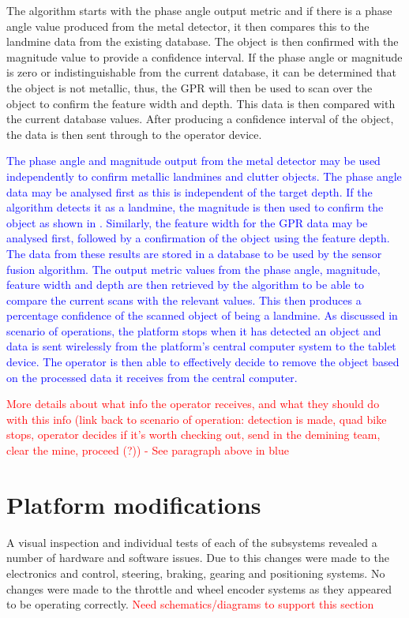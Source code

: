 \documentclass[main.tex]{subfiles}
\begin{document}
The algorithm starts with the phase angle output metric and if there is a phase angle value produced from the metal detector, it then compares this to the landmine data from the existing database. The object is then confirmed with the magnitude value to provide a confidence interval. If the phase angle or magnitude is zero or indistinguishable from the current database, it can be determined that the object is not metallic, thus, the GPR will then be used to scan over the object to confirm the feature width and depth. This data is then compared with the current database values. After producing a confidence interval of the object, the data is then sent through to the operator device.  


\textcolor{blue}{The phase angle and magnitude output from the metal detector may be used independently to confirm metallic landmines and clutter objects. The phase angle data may be analysed first as this is independent of the target depth. If the algorithm detects it as a landmine, the magnitude is then used to confirm the object as shown in . Similarly, the feature width for the GPR data may be analysed first, followed by a confirmation of the object using the feature depth. The data from these results are stored in a database to be used by the sensor fusion algorithm. The output metric values from the phase angle, magnitude, feature width and depth are then retrieved by the algorithm to be able to compare the current scans with the relevant values. This then produces a percentage confidence of the scanned object of being a landmine. As discussed in scenario of operations, the platform stops when it has detected an object and data is sent wirelessly from the platform’s central computer system to the tablet device. The operator is then able to effectively decide to remove the object based on the processed data it receives from the central computer.} 

\textcolor{red}{More details about what info the operator receives, and what they should do with this info (link back to scenario of operation: detection is made, quad bike stops, operator decides if it's worth checking out, send in the demining team, clear the mine, proceed (?)) - See paragraph above in blue}

\section{Platform modifications}
A visual inspection and individual tests of each of the subsystems revealed a number of hardware and software issues. Due to this changes were made to the electronics and control, steering, braking, gearing and positioning systems. No changes were made to the throttle and wheel encoder systems as they appeared to be operating correctly. \textcolor{red}{Need schematics/diagrams to support this section}
\end{document}
